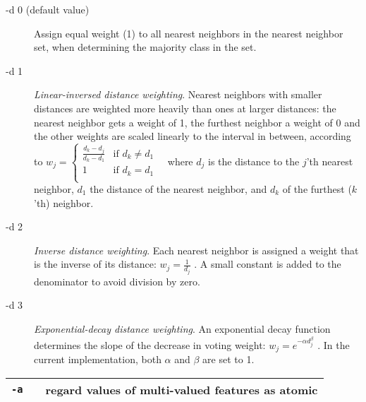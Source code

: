 \documentclass[11pt]{article}
\begin{document}
\begin{description}

\item[-d 0 (default value)] Assign equal weight (1) to all nearest neighbors in the nearest neighbor set, when determining the majority class in the set.

\item[-d 1] {\em Linear-inversed distance weighting}. Nearest neighbors
with smaller distances are weighted more heavily than ones at larger
distances: the nearest neighbor gets a weight of 1, the furthest
neighbor a weight of 0 and the other weights are scaled linearly to
the interval in between, according to
\begin{math}
w_{j}= \left \{ \begin{array}{ll}  
                        \frac{d_{k} - d_{j}}{d_{k} - d_{1}} & \mbox{if $d_{k}
\not= d_{1}$ } \\ 
                        1 & \mbox{if $d_{k} = d_{1}$}\\
                    \end{array} 
          \right. 
\end{math}
where $d_{j}$ is the distance to the $j$'th nearest neighbor, $d_{1}$
the distance of the nearest neighbor, and $d_{k}$ of the furthest
($k$'th) neighbor.

\item[-d 2] {\em Inverse distance weighting}. Each nearest neighbor is assigned a weight that is the inverse of its distance:
\begin{math}
w_{j}= \frac{1}{d_{j}}
\end{math}
. A small constant is added to the denominator to avoid division
by zero.

\item[-d 3] {\em Exponential-decay distance weighting}. An exponential decay function determines the slope of the decrease in voting weight: 
\begin{math}
w_{j}= e^{-\alpha d_{j}^\beta}
\end{math}
. In the current implementation, both $\alpha$ and $\beta$ are set to 1.

\end{description}

\begin{tabular}{|p{}|p{}|p{}|}
\hline
{\tt -a} & & regard values of multi-valued features as atomic \\
\hline
\end{tabular}
\end{document}
